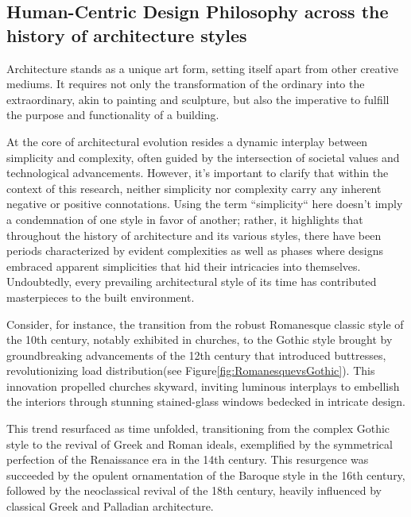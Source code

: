 \subsection{Human-Centric Design Philosophy across the history of architecture styles}
\label{subsec:TimelineArchitectureStyles}



Architecture stands as a unique art form, setting itself apart from other creative mediums.
It requires not only the transformation of the ordinary into the extraordinary, akin to painting and sculpture, but also the imperative to fulfill the purpose and functionality of a building\cite{Hnin2022}.

At the core of architectural evolution resides a dynamic interplay between simplicity and complexity, often guided by the intersection of societal values and technological advancements\cite{Economakis2023}.
However, it's important to clarify that within the context of this research, neither simplicity nor complexity carry any inherent negative or positive connotations.
Using the term ``simplicity`` here doesn't imply a condemnation of one style in favor of another;
rather, it highlights that throughout the history of architecture and its various styles, there have been periods characterized by evident complexities as well as phases where designs embraced apparent simplicities that hid their intricacies into themselves.
Undoubtedly, every prevailing architectural style of its time has contributed masterpieces to the built environment.

Consider, for instance, the transition from the robust Romanesque classic style of the 10th century, notably exhibited in churches, to the Gothic style brought by groundbreaking advancements of the 12th century that introduced buttresses, revolutionizing load distribution\cite{Arora2023}(see Figure\ref{fig:RomanesquevsGothic}).
This innovation propelled churches skyward, inviting luminous interplays to embellish the interiors through stunning stained-glass windows bedecked in intricate design\cite{Stacbond2020}.

This trend resurfaced as time unfolded, transitioning from the complex Gothic style to the revival of Greek and Roman ideals, exemplified by the symmetrical perfection of the Renaissance era in the 14th century.
This resurgence was succeeded by the opulent ornamentation of the Baroque style in the 16th century, followed by the neoclassical revival of the 18th century, heavily influenced by classical Greek and Palladian architecture.

